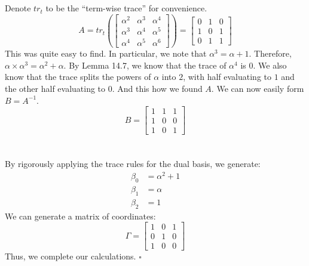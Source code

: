 \documentclass[letterpaper]{article}
\newcommand*{\QED}{\hfill\ensuremath{\square}}%
\begin{document}
\section{}
\label{sec:Question3}
Denote $ tr_t $ to be the ``term-wise trace'' for convenience.
\[
A =
tr_t \left(\begin{bmatrix}
    \alpha^2 & \alpha^3 & \alpha^4 \\
    \alpha^3 & \alpha^4 & \alpha^5 \\
    \alpha^4 & \alpha^5 & \alpha^6
\end{bmatrix} \right) =
\begin{bmatrix}
    0 & 1 & 0 \\
    1 & 0 & 1 \\
    0 & 1 & 1
\end{bmatrix}
\]
This was quite easy to find.
In particular, we note that $ \alpha^3 = \alpha + 1 $.
Therefore, $ \alpha \times \alpha^3 = \alpha^2 + \alpha $.
By Lemma 14.7, we know that the trace of $ \alpha^4 $ is $ 0 $.
We also know that the trace splits the powers of $ \alpha $ into $ 2 $, with half evaluating to $ 1 $ and the other half evaluating to $ 0 $.
And this how we found $ A $.
We can now easily form $ B = A^{-1} $.
\[
B =
\begin{bmatrix}
    1 & 1 & 1 \\
    1 & 0 & 0 \\
    1 & 0 & 1
\end{bmatrix}
\]
\\ \\
By rigorously applying the trace rules for the dual basis, we generate:
\begin{align}
    \beta_0 &= \alpha^2 + 1 \\
    \beta_1 &= \alpha \\
    \beta_2 &= 1
\end{align}
We can generate a matrix of coordinates:
\[
\Gamma =
\begin{bmatrix}
    1 & 0 & 1 \\
    0 & 1 & 0 \\
    1 & 0 & 0
\end{bmatrix}
\]
Thus, we complete our calculations.
\QED{}

\section{}
\label{sec:Question4}
\end{document}
